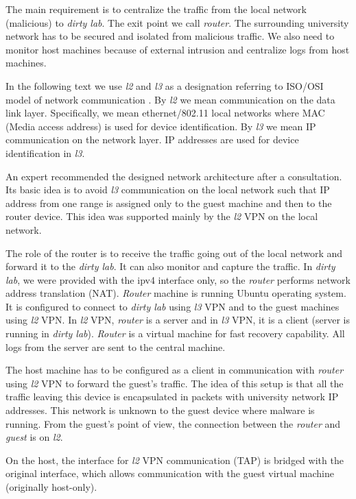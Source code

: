 The main requirement is to centralize the traffic from the local network (malicious) to \emph{dirty lab}. The exit point we call \emph{router}. The surrounding university network has to be secured and isolated from malicious traffic. We also need to monitor host machines because of external intrusion and centralize logs from host machines.

In the following text we use \emph{l2} and \emph{l3} as a designation referring to ISO/OSI model of network communication \cite{Zimmermann1980}. By \emph{l2} we mean communication on the data link layer. Specifically, we mean ethernet/802.11 local networks where MAC (Media access address) is used for device identification. By \emph{l3} we mean IP communication on the network layer. IP addresses are used for device identification in \emph{l3}.

An expert recommended the designed network architecture after a consultation. Its basic idea is to avoid \emph{l3} communication on the local network such that IP address from one range is assigned only to the guest machine and then to the router device. This idea was supported mainly by the \emph{l2} VPN on the local network.

The role of the router is to receive the traffic going out of the local network and forward it to the \emph{dirty lab}. It can also monitor and capture the traffic. In \emph{dirty lab}, we were provided with the ipv4 interface only, so the \emph{router} performs network address translation (NAT). \emph{Router} machine is running Ubuntu operating system. It is configured to connect to \emph{dirty lab} using \emph{l3} VPN and to the guest machines using \emph{l2} VPN. In \emph{l2} VPN, \emph{router} is a server and in \emph{l3} VPN, it is a client (server is running in \emph{dirty lab}). \emph{Router} is a virtual machine for fast recovery capability. All logs from the server are sent to the central machine.

The host machine has to be configured as a client in communication with \emph{router} using \emph{l2} VPN to forward the guest's traffic. The idea of this setup is that all the traffic leaving this device is encapsulated in packets with university network IP addresses. This network is unknown to the guest device where malware is running. From the guest's point of view, the connection between the \emph{router} and \emph{guest} is on \emph{l2}. 

On the host, the interface for \emph{l2} VPN communication (TAP) is bridged with the original interface, which allows communication with the guest virtual machine (originally host-only). 

